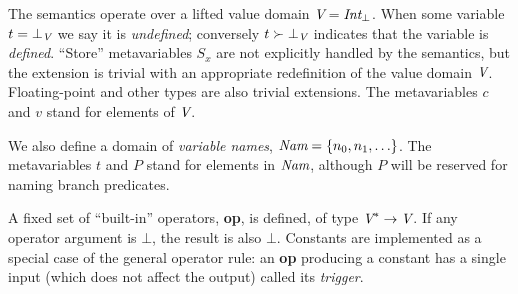 \documentclass[12pt,titlepage]{article}
\begin{document}
The semantics operate over a lifted value domain
${\mbox{\em V}}={\mbox{\em Int}}_\bot$. When some variable
$t = \bot_{\mbox{\scriptsize\em V}}$ we say it is
\emph{undefined}; conversely $t\succ\bot_{\mbox{\scriptsize\em V}}$ indicates that the
variable is \emph{defined}.  ``Store'' metavariables $S_x$ are not
explicitly handled by the semantics, but the extension is trivial with
an appropriate redefinition of the value domain ${\mbox{\em V}}$.  Floating-point
and other types are also trivial extensions.  The
metavariables $c$ and $v$ stand for elements of ${\mbox{\em V}}$.

We also define a domain of \emph{variable names},
${\mbox{\em Nam}}=\left\{n_0,n_1,\ldots\right\}$.  The metavariables $t$ and $P$ stand for
elements in ${\mbox{\em Nam}}$, although $P$ will be reserved for naming branch predicates.

A fixed set of ``built-in'' operators, \textbf{op}, is defined,
of type ${\mbox{\em V}}^* \to {\mbox{\em V}}$.  If any operator argument is $\bot$, the
result is also $\bot$.  Constants are implemented as a special case of
the general operator rule: an \textbf{op} producing a constant has a
single input (which does not affect the output) called its \emph{trigger}.
\end{document}

